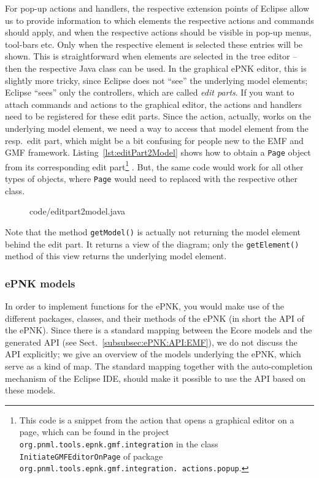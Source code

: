 For pop-up actions and handlers, the respective extension points of Eclipse allow us
to provide information to which elements the respective actions and commands should apply,
and when the respective actions should be visible in pop-up menus, tool-bars etc. Only when
the respective element is selected these entries will be shown. This is straightforward
when elements are selected in the tree editor -- then the respective Java class
can be used. In the graphical ePNK editor, this is slightly more tricky, since
Eclipse does not ``see'' the underlying model elements; Eclipse ``sees'' only the
controllers, which are called \emph{edit parts}.%
If you want to attach commands and actions to the graphical editor, the actions
and handlers need to be registered for these edit parts. Since the action,
actually, works on the underlying model element, we need a way to access
that model element from the resp.\ edit part, which might be a bit confusing for
people new to the EMF and GMF framework.
%
Listing~\ref{lst:editPart2Model} shows how to obtain a {\tt Page} object from its
corresponding edit part\footnote
  {This code is a snippet from the action that opens a graphical editor on a page,
   which can be found in the project {\tt org.pnml.tools.epnk.gmf.integration}
   in the class {\tt InitiateGMFEditorOnPage} of package
   {\tt org.pnml.tools.epnk.gmf.integration. actions.popup}.}%
. But, the same code would work for all other types of objects,
where {\tt Page} would need to replaced with the respective other class.
%
\begin{figure}[htbp!]
%
  {code/editpart2model.java}
\end{figure}
%
Note that the method {\tt getModel()} is actually not returning the
model element behind the edit part. It returns a view of the diagram; only
the {\tt getElement()} method of this view returns the underlying model
element.


\subsubsection{ePNK models}

In order to implement functions for the ePNK, you would make use of the
different packages, classes, and their methods of the ePNK (in short the API of the ePNK).
Since there is a standard mapping between the Ecore models and the generated API (see
Sect.~\ref{subsubsec:ePNK:API:EMF}), we do not discuss the API explicitly;
we give an overview of the models underlying the ePNK, which serve as a kind
of map. The standard mapping together with the auto-completion mechanism
of the Eclipse IDE, should make it possible to use the API based on these
models.

